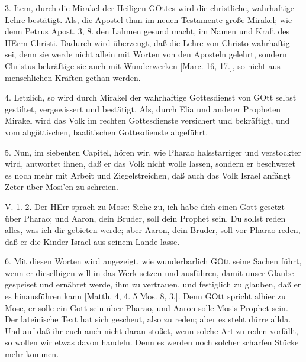 3. Item, durch die Mirakel der Heiligen GOttes wird die christliche, wahrhaftige Lehre bestätigt. Als, die Apostel thun im neuen Testamente große Mirakel; wie denn Petrus Apost. 3, 8. den Lahmen gesund macht, im Namen und Kraft des HErrn Christi. Dadurch wird überzeugt, daß die Lehre von Christo wahrhaftig sei, denn sie werde nicht allein mit Worten von den Aposteln gelehrt, sondern Christus bekräftige sie auch mit Wunderwerken [Marc. 16, 17.], so nicht aus menschlichen Kräften gethan werden.

4. Letzlich, so wird durch Mirakel der wahrhaftige Gottesdienst von GOtt selbst gestiftet, vergewissert und bestätigt. Als, durch Elia und anderer Propheten Mirakel wird das Volk im rechten Gottesdienste versichert und bekräftigt, und vom abgöttischen, baalitischen Gottesdienste abgeführt.

5. Nun, im siebenten Capitel, hören wir, wie Pharao halsstarriger und verstockter wird, antwortet ihnen, daß er das Volk nicht wolle lassen, sondern er beschweret es noch mehr mit Arbeit und Ziegelstreichen, daß auch das Volk Israel anfängt Zeter über Mosi'en zu schreien.

\begin{schriftzitat}
V. 1. 2. Der HErr sprach zu Mose: Siehe zu, ich habe dich einen Gott gesetzt über Pharao; und Aaron, dein Bruder, soll dein Prophet sein. Du sollst reden alles, was ich dir gebieten werde; aber Aaron, dein Bruder, soll vor Pharao reden, daß er die Kinder Israel aus seinem Lande lasse.
\end{schriftzitat}

6. Mit diesen Worten wird angezeigt, wie wunderbarlich GOtt seine Sachen führt, wenn er dieselbigen will in das Werk setzen und ausführen, damit unser Glaube gespeiset und ernähret werde, ihm zu vertrauen, und festiglich zu glauben, daß er es hinausführen kann [Matth. 4, 4. 5 Mos. 8, 3.]. Denn GOtt spricht alhier zu Mose, er solle ein Gott sein über Pharao, und Aaron solle Mosis Prophet sein. Der lateinische Text hat sich gescheut, also zu reden; aber es steht dürre allda. Und auf daß ihr euch auch nicht daran stoßet, wenn solche Art zu reden vorfällt, so wollen wir etwas davon handeln. Denn es werden noch solcher scharfen Stücke mehr kommen.

